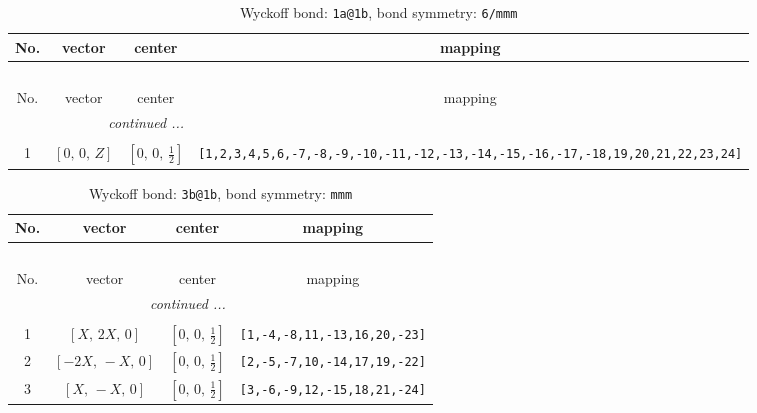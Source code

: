 \documentclass[fleqn,8pt]{jsarticle}
\begin{document}
\begin{longtable}{cccc}
\caption{Wyckoff bond: {\tt 1a@1b}, bond symmetry: {\tt 6/mmm}}
 \\
 \hline \hline
No. & vector & center & mapping \\ \hline \endfirsthead

\multicolumn{3}{l}{\tablename\ \thetable{}} \\
 \hline \hline
No. & vector & center & mapping \\ \hline \endhead

 \hline \hline
\multicolumn{3}{r}{\footnotesize\it continued ...} \\ \endfoot

 \hline \hline
\multicolumn{3}{r}{} \\ \endlastfoot

1 & $\left[ 0,\, 0,\, Z \right]$ & $\left[ 0,\, 0,\, \frac{1}{2} \right]$ & {\tt [1,2,3,4,5,6,-7,-8,-9,-10,-11,-12,-13,-14,-15,-16,-17,-18,19,20,21,22,23,24]} \\
\end{longtable}
\renewcommand{\arraystretch}{1.2}
\begin{longtable}{cccc}
\caption{Wyckoff bond: {\tt 3b@1b}, bond symmetry: {\tt mmm}}
 \\
 \hline \hline
No. & vector & center & mapping \\ \hline \endfirsthead

\multicolumn{3}{l}{\tablename\ \thetable{}} \\
 \hline \hline
No. & vector & center & mapping \\ \hline \endhead

 \hline \hline
\multicolumn{3}{r}{\footnotesize\it continued ...} \\ \endfoot

 \hline \hline
\multicolumn{3}{r}{} \\ \endlastfoot

1 & $\left[ X,\, 2 X,\, 0 \right]$ & $\left[ 0,\, 0,\, \frac{1}{2} \right]$ & {\tt [1,-4,-8,11,-13,16,20,-23]} \\ \hline
2 & $\left[ - 2 X,\, - X,\, 0 \right]$ & $\left[ 0,\, 0,\, \frac{1}{2} \right]$ & {\tt [2,-5,-7,10,-14,17,19,-22]} \\ \hline
3 & $\left[ X,\, - X,\, 0 \right]$ & $\left[ 0,\, 0,\, \frac{1}{2} \right]$ & {\tt [3,-6,-9,12,-15,18,21,-24]} \\
\end{longtable}
\renewcommand{\arraystretch}{1.2}
\end{document}
